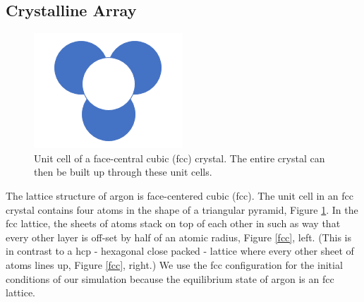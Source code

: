 \documentclass{article}
\begin{document}
\begin{multicols}{2}
\subsection{Crystalline Array}

\begin{figure}[H]
\begin{center}
\includegraphics[width=0.65\linewidth]{plots/crystal_structure.png}
\caption{Unit cell of a face-central cubic (fcc) crystal.  The entire crystal can then be built up through these unit cells.}
\label{unitcell}
\end{center}
\end{figure}

The lattice structure of argon is face-centered cubic (fcc).  The unit cell in an fcc crystal contains four atoms in the shape of a triangular pyramid, Figure \ref{unitcell}.  In the fcc lattice, the sheets of atoms stack on top of each other in such as way that every other layer is off-set by half of an atomic radius, Figure \ref{fcc}, left.  (This is in contrast to a hcp - hexagonal close packed - lattice where every other sheet of atoms lines up, Figure \ref{fcc}, right.)  \cite{crystal}  We use the fcc configuration for the initial conditions of our simulation because the equilibrium state of argon is an fcc lattice.  


\end{multicols}
\end{document}
